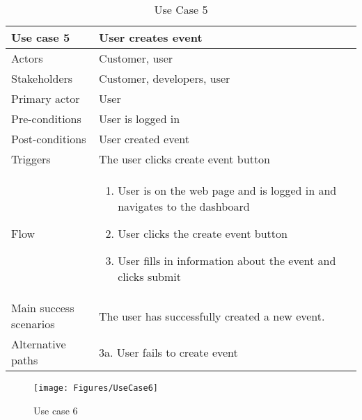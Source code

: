 \begin{table}[H]
\begin{tabular}{ | L{0.25\linewidth} | L{0.75\linewidth} | } 
 \hline {}
 Use case 5 & User creates event  \\ 
 \hline
 Actors & Customer, user \\ 
 \hline
 Stakeholders & Customer, developers, user \\ 
  \hline
 Primary actor & User  \\ 
 \hline
 Pre-conditions & User is logged in \\ 
 \hline
 Post-conditions & User created event \\ 
  \hline
 Triggers & The user clicks create event button  \\ 
 \hline
Flow & 
    \vspace{-5mm}
    \begin{enumerate}[noitemsep]
  \item User is on the web page and is logged in and navigates to the dashboard
  \item User clicks the create event button 
  \item User fills in information about the event and clicks submit
   \end{enumerate}\\ 
 \hline
 Main success scenarios & The user has successfully created a new event. \\ 
 \hline
 Alternative paths & 3a. User fails to create event\\
 \hline
\end{tabular}
\caption{Use Case 5}
\end{table}

\begin{figure}[H]
\centering
\texttt{[image: Figures/UseCase6]}
\caption{Use case 6}
    \label{fig:UC6}
    \end{figure}

